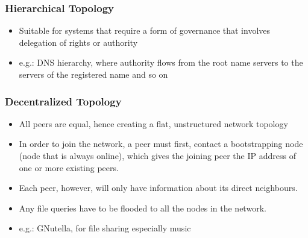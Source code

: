 \documentclass{article}
\begin{document}
\subsubsection{Hierarchical Topology}
\begin{itemize}
    \item Suitable for systems that require a form of governance that involves delegation of rights or authority
    
    \item e.g.: DNS hierarchy, where authority flows from the root name servers to the servers of the registered name and so on
\end{itemize}

\subsubsection{Decentralized Topology}
\begin{itemize}
    \item All peers are equal, hence creating a flat, unstructured network topology 
    
    \item In order to join the network, a peer must first, contact a bootstrapping node (node that is always online), which gives the joining peer the IP address of one or more existing peers.
    
    \item Each peer, however, will only have information about its direct neighbours. 
    
    \item Any file queries have to be flooded to all the nodes in the network. 
    
    \item e.g.: GNutella, for file sharing especially music
\end{itemize}
\end{document}
